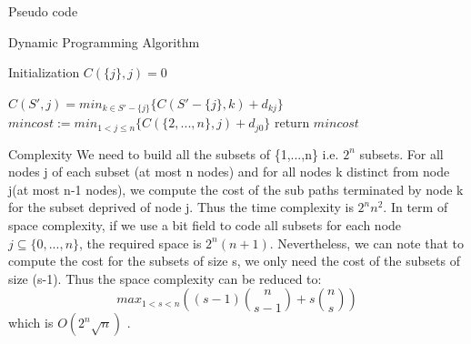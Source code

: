 \documentclass[../report.tex]{subfiles}
\begin{document}
\begin{subsection}{Pseudo code}
\begin{center}
	\colorbox[gray]{0.95}{
	\begin{minipage}{0.65\textwidth}
			\begin{algorithm}[H]
			\caption{Dynamic Programming Algorithm}
			\begin{algorithmic} 
			\STATE Initialization
			\STATE $C(\{j\},j)=0$
			\ENDFOR

					 \STATE $C(S',j)=min_{k \in S'-\{j\}}\{C(S'-\{j\},k)+d_{kj}\}$
				  \ENDFOR
			   \ENDFOR
			\ENDFOR
			\STATE $mincost := min_{1<j \leq n}\{C(\{2,...,n\},j)+d_{j0}\}$
			\STATE return $mincost$
			\end{algorithmic}
			\end{algorithm}
	 \end{minipage}}
\end{center}

\end{subsection}




\begin{subsection}{Complexity}
   We need to build all the subsets of \{1,...,n\} i.e. $2^n$ subsets. For all nodes j of each subset (at most n nodes) and for all nodes k distinct from node j(at most n-1 nodes), we compute the cost of the sub paths terminated by node k for the subset deprived of node j.
Thus the time complexity is $2^n n^2$.
\newline{} In term of space complexity, if we use a bit field to code all subsets for each node $j \subseteq \{0,...,n\}$, the required space is $2^n (n+1)$.
\newline{} Nevertheless, we can note that to compute the cost for the subsets of size s, we only need the cost of the subsets of size (s-1). Thus the space complexity can be reduced to:
$$  max_{1<s<n}((s-1) \binom{n}{s-1} + s\binom{n}{s})$$
which is $O(2^n\sqrt n)$ .
\end{subsection}
\end{document}
